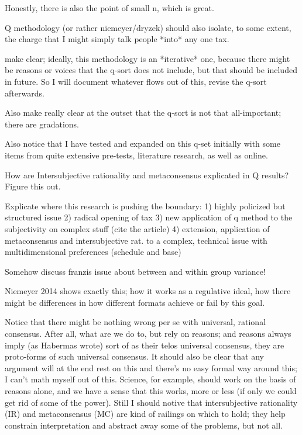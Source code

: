 Honestly, there is also the point of small n, which is great.

Q methodology (or rather niemeyer/dryzek) should also isolate, to some extent, the charge that I might simply talk people *into* any one tax.

make clear; ideally, this methodology is an *iterative* one, because there might be reasons or voices that the q-sort does not include, but that should be included in future.
So I will document whatever flows out of this, revise the q-sort afterwards.

Also make really clear at the outset that the q-sort is not that all-important; there are gradations.

Also notice that I have tested and expanded on this q-set initially with some items from quite extensive pre-tests, literature research, as well as online.

How are Intersubjective rationality and metaconsensus explicated in Q results?
Figure this out.

Explicate where this research is pushing the boundary:
1) highly policized but structured issue
2) radical opening of tax
3) new application of q method to the subjectivity on complex stuff (cite the article)
4) extension, application of metaconsensus and intersubjective rat. to a complex, technical issue with multidimensional preferences (schedule and base)

Somehow discuss franzis issue about between and within group variance!

Niemeyer 2014 shows exactly this; how it works as a regulative ideal, how there might be differences in how different formats achieve or fail by this goal.

Notice that there might be nothing wrong per se with universal, rational consensus.
After all, what are we do to, but rely on reasons; and reasons always imply (as Habermas wrote) sort of as their telos universal consensus, they are proto-forms of such universal consensus.
It should also be clear that any argument will at the end rest on this and there's no easy formal way around this; I can't math myself out of this.
Science, for example, should work on the basis of reasons alone, and we have a sense that this works, more or less (if only we could get rid of some of the power).
Still I should notive that intersubjective rationality (IR) and metaconsensus (MC) are kind of railings on which to hold; they help constrain interpretation and abstract away some of the problems, but not all.

